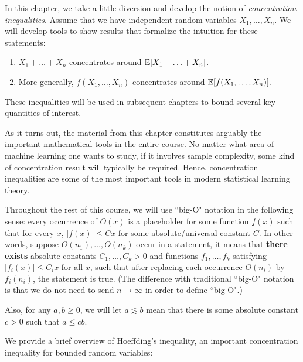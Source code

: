 \setcounter{section}{0}


In this chapter, we take a little diversion and develop the notion of \emph{concentration inequalities}. Assume that we have independent random variables $X_1, \ldots, X_n$. We will develop tools to show results that formalize the intuition for these statements:
\begin{enumerate}
    \item $X_1 + \ldots + X_n$ concentrates around $\operatorname*{\mathbb{E}}[X_1 + \ldots + X_n]$.
    \item More generally, $f(X_1, \ldots, X_n)$ concentrates around $\operatorname*{\mathbb{E}}[f(X_1, \ldots, X_n)]$.
\end{enumerate}

These inequalities will be used in subsequent chapters to bound several key quantities of interest.

As it turns out, the material from this chapter constitutes arguably the important mathematical tools in the entire course. No matter what area of machine learning one wants to study, if it involves sample complexity, some kind of concentration result will typically be required. Hence, concentration inequalities are some of the most important tools in modern statistical learning theory.


Throughout the rest of this course, we will use ``big-O" notation in the following sense: every occurrence of $O(x)$ is a placeholder for some function $f(x)$ such that for every $x$, $|f(x)| \leq Cx$ for some absolute/universal constant $C$. In other words, suppose $O(n_1),\dots, O(n_k)$ occur in a statement, it means that \textbf{there exists} absolute constants $C_1,\dots, C_k > 0$ and functions $f_1,\dots, f_k$ satisfying $|f_i(x)|\le C_ix$ for all $x$, such that after replacing each occurrence $O(n_i)$ by $f_i(n_i)$,  the statement is true.  (The difference with traditional ``big-O" notation is that we do not need to send $n \to \infty$ in order to define ``big-O".)

Also, for any $a, b \geq 0$, we will let $a \lesssim b$ mean that there is some absolute constant $c > 0$ such that $a \leq cb$.


\label{lec2:subsec:hoeffding}

We provide a brief overview of Hoeffding's inequality, an important concentration inequality for bounded random variables:


